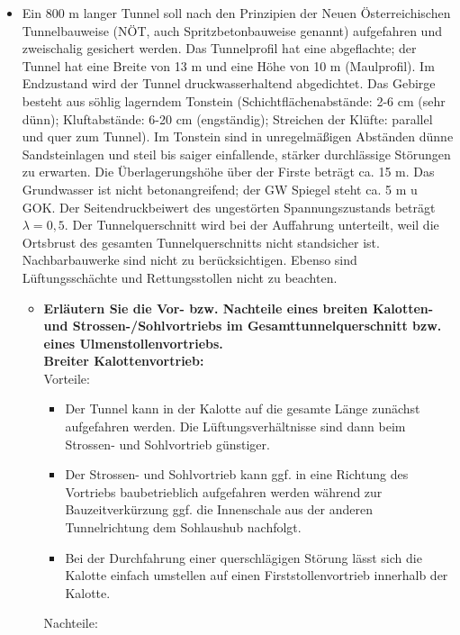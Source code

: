 \documentclass[fleqn,twoside]{article}
\begin{document}
\begin{small}
\begin{itemize}
    \item Ein 800 m langer Tunnel soll nach den Prinzipien der Neuen Österreichischen Tunnelbauweise (NÖT, auch Spritzbetonbauweise genannt) aufgefahren und zweischalig gesichert werden. Das Tunnelprofil hat eine abgeflachte; der Tunnel hat eine Breite von 13 m und eine Höhe von 10 m (Maulprofil). Im Endzustand wird der Tunnel druckwasserhaltend abgedichtet. Das Gebirge besteht aus söhlig lagerndem Tonstein (Schichtflächenabstände: 2-6 cm (sehr dünn); Kluftabstände: 6-20 cm (engständig); Streichen der Klüfte: parallel und quer zum Tunnel). Im Tonstein sind in unregelmäßigen Abständen dünne Sandsteinlagen und steil bis saiger einfallende, stärker durchlässige Störungen zu erwarten. Die Überlagerungshöhe über der Firste beträgt ca. 15 m. Das Grundwasser ist nicht betonangreifend; der GW Spiegel steht ca. 5 m u GOK. Der Seitendruckbeiwert des ungestörten Spannungszustands beträgt $\lambda = 0,5$. Der Tunnelquerschnitt wird bei der Auffahrung unterteilt, weil die Ortsbrust des gesamten Tunnelquerschnitts nicht standsicher ist. Nachbarbauwerke sind nicht zu berücksichtigen. Ebenso sind Lüftungsschächte und Rettungsstollen nicht zu beachten.
    \begin{itemize}[label={$\blacktriangleright$}]
        \item \textbf{Erläutern Sie die Vor- bzw. Nachteile eines breiten Kalotten- und Strossen-/Sohlvortriebs im Gesamttunnelquerschnitt bzw. eines Ulmenstollenvortriebs.}\\
        \textbf{Breiter Kalottenvortrieb:}\\
        Vorteile:
        \begin{itemize}[label={$\blacktriangleright$}]
            \item Der Tunnel kann in der Kalotte auf die gesamte Länge zunächst aufgefahren werden. Die Lüftungsverhältnisse sind dann beim Strossen- und Sohlvortrieb günstiger.
            \item Der Strossen- und Sohlvortrieb kann ggf. in eine Richtung des Vortriebs baubetrieblich aufgefahren werden während zur Bauzeitverkürzung ggf. die Innenschale aus der anderen Tunnelrichtung dem Sohlaushub nachfolgt.
            \item Bei der Durchfahrung einer querschlägigen Störung lässt sich die Kalotte einfach umstellen auf einen Firststollenvortrieb innerhalb der Kalotte.
        \end{itemize}
        Nachteile:
        \begin{itemize}[label={$\blacktriangleright$}]

\end{itemize}
\end{itemize}
\end{itemize}
\end{small}
\end{document}
